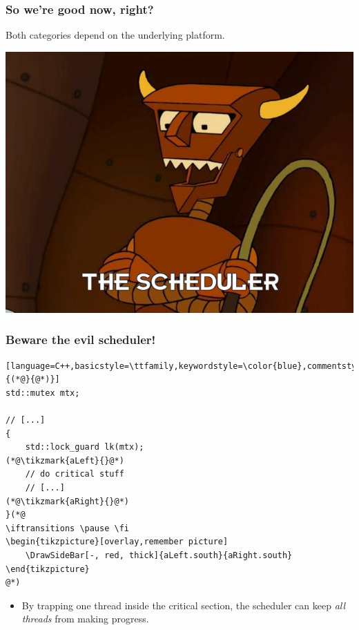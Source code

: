 \documentclass{beamer}
\newcommand{\tikzmark}[2]{%
     \tikz[overlay,remember picture] \node[text=black,
           inner sep=2pt] (#1) {#2};}
\newcommand{\HorizontalShiftForBar}{2.0em,+0.0ex}%
\newcommand{\Stub}{0.0em,-0.6ex}%
\newcommand{\DrawSideBar}[3][]{%
        \coordinate (top left)  at ($(#2)       +(\HorizontalShiftForBar)$);
        \coordinate (start)     at ($(top left) +(\Stub)$);
        \coordinate (top right) at ($(#3)       +(\HorizontalShiftForBar)$);
        \coordinate (end)       at ($(top right)+(\Stub)$);
        \draw [#1] (start) -- (top left) -- (top right) -- (end);
}%
\newif\iftransitions
\begin{document}
\begin{frame}[fragile]
  \frametitle{So we're good now, right?}

  Both categories depend on the underlying platform.

  \iftransitions \pause \fi

  \begin{center}
  \includegraphics[height=0.7\textheight]{resources/robot-devil-scheduler.jpg}
  \end{center}
\end{frame}


\begin{frame}[fragile]

\frametitle{Beware the evil scheduler!}

\begin{lstlisting}[language=C++,basicstyle=\ttfamily,keywordstyle=\color{blue},commentstyle=\color{teal}\itshape,showstringspaces=false,escapeinside={(*@}{@*)}]
std::mutex mtx;

// [...]
{
    std::lock_guard lk(mtx);
(*@\tikzmark{aLeft}{}@*)
    // do critical stuff
    // [...]
(*@\tikzmark{aRight}{}@*)
}(*@
\iftransitions \pause \fi
\begin{tikzpicture}[overlay,remember picture]
    \DrawSideBar[-, red, thick]{aLeft.south}{aRight.south}
\end{tikzpicture}
@*)\end{lstlisting}

\begin{itemize}
    \item By trapping one thread inside the critical section, the scheduler can keep \emph{all threads} from making progress.
\end{itemize}

\end{frame}
\end{document}
